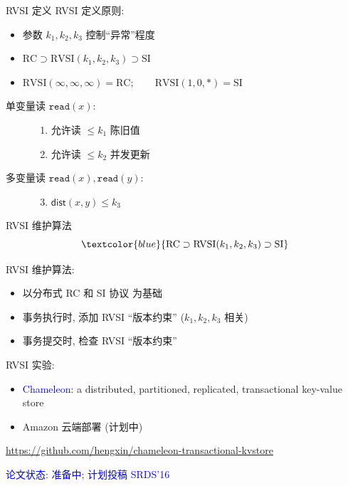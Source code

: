 \begin{frame}{RVSI 定义}
  RVSI 定义原则:
  \begin{itemize}
    \item 参数 $k_1, k_2, k_3$ 控制``异常''程度
    \item $\text{RC} \supset \text{RVSI}(k_1, k_2, k_3) \supset \text{SI}$
    \item $\text{RVSI}(\infty,\infty,\infty) = \text{RC}; \qquad \text{RVSI}(1,0,\ast) = \text{SI}$
  \end{itemize}

  \begin{cdefinition}
    \begin{description}
      \item[单变量读 $\texttt{read}(x)$:] \hfill 
        \begin{enumerate}
          \item 允许读 $\le k_1$ 陈旧值
          \item 允许读 $\le k_2$ 并发更新
        \end{enumerate}
      \item[多变量读 $\texttt{read}(x), \texttt{read}{(y)}$:] \hfill
        \begin{enumerate}
          \setcounter{enumi}{2}
          \item $\textsf{dist}(x,y) \le k_3$
        \end{enumerate}
    \end{description}
  \end{cdefinition}
\end{frame}


\begin{frame}{RVSI 维护算法}
  \[
    \textcolor{blue}{\text{RC} \supset \text{RVSI}(k_1, k_2, k_3) \supset \text{SI}}
  \]

  \vspace{0.10cm}

  RVSI 维护算法:
  \begin{itemize}
    \item 以分布式 RC 和 SI 协议 为基础
    \item 事务执行时, 添加 RVSI ``版本约束'' ($k_1, k_2, k_3$ 相关)
    \item 事务提交时, 检查 RVSI ``版本约束''
  \end{itemize}

  \pause

  \vspace{0.30cm}
  RVSI 实验:
  \begin{itemize}
    \item \textcolor{blue}{Chameleon:} a distributed, partitioned, replicated, transactional key-value store
    \item Amazon 云端部署 (计划中)
  \end{itemize}

  \textcolor{red}{\small \url{https://github.com/hengxin/chameleon-transactional-kvstore}}

  \begin{center}
    \textcolor{blue}{论文状态: 准备中; 计划投稿 SRDS'16}
  \end{center}
\end{frame}
